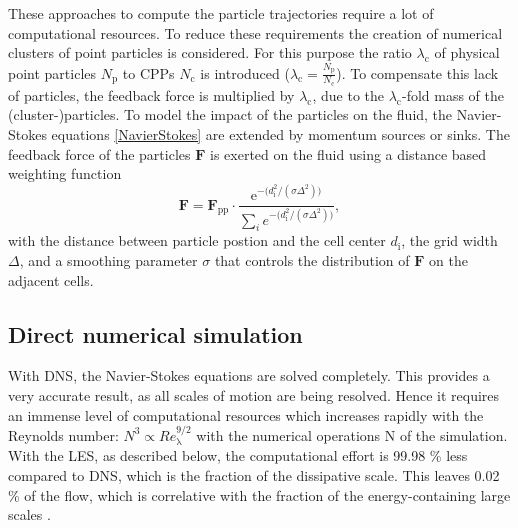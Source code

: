 \documentclass[11pt,a4paper,openany,oneside,parskip=half*]{article}
\renewcommand*\vec[1]{\boldsymbol{#1}}
\begin{document}
\newline
These approaches to compute the particle trajectories require a lot of computational resources. 
\newline
To reduce these requirements the creation of numerical clusters of point particles is considered. For this purpose the ratio $\lambda_\mathrm{c}$ of physical point particles $N_\mathrm{p}$ to CPPs $N_\mathrm{c}$ is introduced ($\lambda_\mathrm{c} = \frac{N_\mathrm{p}}{N_\mathrm{c}}$). To compensate this lack of particles, the feedback force is multiplied by $\lambda_\mathrm{c}$, due to the $\lambda_\mathrm{c}$-fold mass of the (cluster-)particles.
\newline
To model the impact of the particles on the fluid, the Navier-Stokes equations \eqref{NavierStokes} are extended by momentum sources or sinks. The feedback force of the particles $\vec{F}$ is exerted on the fluid using a distance based weighting function
\begin{equation}
\vec{F} = \vec{F}_\mathrm{pp} \cdot \frac{\mathrm{e}^{- \big(d_\mathrm{i}^\mathrm{2}/(\sigma \Delta^\mathrm{2})\big)}}{\sum \limits_{i} e^{- \big(d_\mathrm{i}^\mathrm{2}/(\sigma \Delta^\mathrm{2}) \big)}},
\end{equation}
with the distance between particle postion and the cell center $d_\mathrm{i}$, the grid width $\Delta$, and a smoothing parameter $\sigma$ that controls the distribution of $\vec{F}$ on the adjacent cells.
\newline
\subsection{Direct numerical simulation}
With DNS, the Navier-Stokes equations are solved completely. This provides a very accurate result, as all scales of motion are being resolved. Hence it requires an immense level of computational resources which increases rapidly with the Reynolds number: $N^3 \propto Re_{\mathrm{\lambda}}^{9/2}$ with the numerical operations N of the simulation. With the LES, as described below, the computational effort is 99.98 \% less compared to DNS, which is the fraction of the dissipative scale. This leaves 0.02 \% of the flow, which is correlative with the fraction of the energy-containing large scales \cite{turbulentFlows}.
\newline
\end{document}
